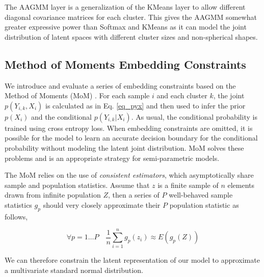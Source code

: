 \documentclass[10pt,twocolumn,letterpaper]{article}
\begin{document}
The AAGMM layer is a generalization of the KMeans layer to allow different diagonal covariance matrices for each cluster.  This gives the AAGMM somewhat greater expressive power than Softmax and KMeans as it can model the joint distribution of latent spaces with different cluster sizes and non-spherical shapes.  

\subsection{Method of Moments Embedding Constraints}
\label{sec:mom}

We introduce and evaluate a series of embedding constraints based on the Method of Moments (MoM) \cite{pearson1936method}.  
For each sample $i$ and each cluster $k$, the joint $p(Y_{i,k},X_i)$ is calculated as in Eq. \ref{eq_pyx} and then used to infer the prior $p(X_i)$ and the conditional $p(Y_{i,k}|X_i)$.
As usual, the conditional probability is trained using cross entropy loss.  
When embedding constraints are omitted, it is possible for the model to learn an accurate decision boundary for the conditional probability without modeling the latent joint distribution.
MoM solves these problems and is an appropriate strategy for semi-parametric models.

The MoM relies on the use of \textit{consistent estimators}, which asymptotically share sample and population statistics.
Assume that $z$ is a finite sample of $n$ elements drawn from infinite population $Z$, then a series of $P$ well-behaved sample statistics $g_p$ should very closely approximate their $P$ population statistic as follows,

\begin{equation}
	\forall p=1 \dots P \quad
	\frac{1}{n} \sum_{i=1}^n g_p(z_i) \approx E(g_p(Z))
\end{equation}

We can therefore constrain the latent representation of our model to approximate a multivariate standard normal distribution.
\end{document}
